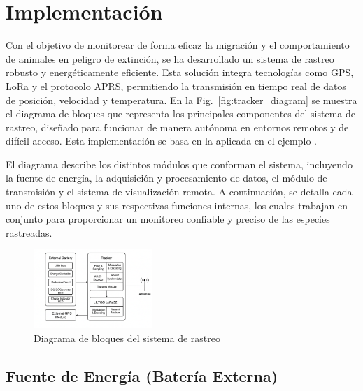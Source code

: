 \documentclass[conference]{IEEEtran}
\begin{document}
\section{\textbf{Implementación}}

\vspace{2mm}

Con el objetivo de monitorear de forma eficaz la migración y el comportamiento de animales en peligro de extinción, se ha desarrollado un sistema de rastreo robusto y energéticamente eficiente. Esta solución integra tecnologías como GPS, LoRa y el protocolo APRS, permitiendo la transmisión en tiempo real de datos de posición, velocidad y temperatura. En la Fig.~\ref{fig:tracker_diagram} se muestra el diagrama de bloques que representa los principales componentes del sistema de rastreo, diseñado para funcionar de manera autónoma en entornos remotos y de difícil acceso. Esta implementación se basa en la aplicada en el ejemplo \cite{paper}.

\vspace{2mm}

El diagrama describe los distintos módulos que conforman el sistema, incluyendo la fuente de energía, la adquisición y procesamiento de datos, el módulo de transmisión y el sistema de visualización remota. A continuación, se detalla cada uno de estos bloques y sus respectivas funciones internas, los cuales trabajan en conjunto para proporcionar un monitoreo confiable y preciso de las especies rastreadas.

\vspace{2mm}

\begin{figure}[H]
    \centering
    \includegraphics[width=0.4\textwidth]{Imagenes/tracker.png}
    \caption{Diagrama de bloques del sistema de rastreo}
    \label{fig:tracker}
\end{figure}

\vspace{2mm}

\subsection{Fuente de Energía (Batería Externa)}
\end{document}
